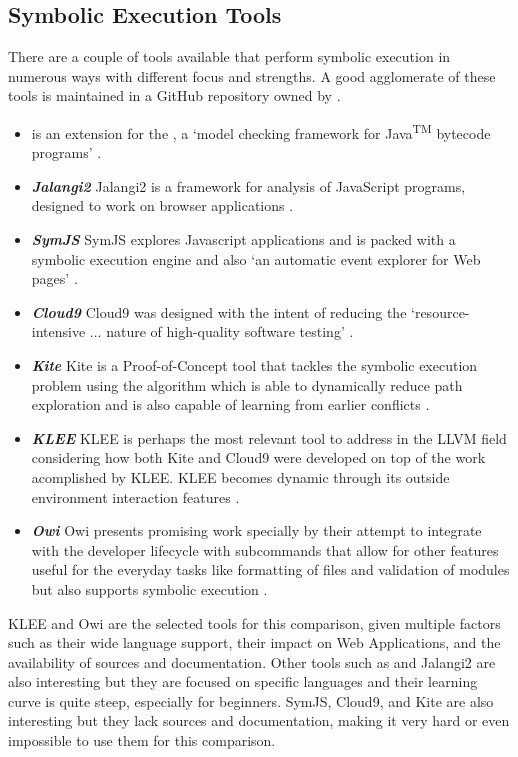 \subsection{Symbolic Execution Tools}\label{chap:symbolic_execution_tools}

There are a couple of tools available that perform symbolic execution in numerous ways with different focus and strengths. A good agglomerate of these tools is maintained in a GitHub repository owned by \citeauthor{Luckow2017} \cite{Luckow2017}. 

\newcommand{\setool}[1]{\item{\textbf{\textit{#1}}}}
\begin{itemize}
    \setool{}  is an extension for the , a `model checking framework for Java\textsuperscript{TM} bytecode programs' \cite{spf,jpf_wiki}. %
    \setool{Jalangi2} Jalangi2 is a framework for analysis of JavaScript programs, designed to work on browser applications \cite{jalangi2}.
    \setool{SymJS} SymJS explores Javascript applications and is packed with a symbolic execution engine and also `an automatic event explorer for Web pages' \cite{Li2014}.
    \setool{Cloud9} Cloud9 was designed with the intent of reducing the `resource-intensive ... nature of high-quality software testing' \cite{cloud9}.
    \setool{Kite} Kite is a Proof-of-Concept tool that tackles the symbolic execution problem using the  algorithm which is able to dynamically reduce path exploration and is also capable of learning from earlier conflicts \cite{cdse_kite,kite_web}.
    \setool{KLEE} KLEE is perhaps the most relevant tool to address in the LLVM field considering how both Kite and Cloud9 were developed on top of the work acomplished by KLEE. KLEE becomes dynamic through its outside environment interaction features \cite{Cadar2008}.
    \setool{Owi} Owi presents promising work specially by their attempt to integrate with the  developer lifecycle with subcommands that allow for other features useful for the everyday tasks like formatting of files and validation of modules but also supports symbolic execution \cite{owi_gh}.
\end{itemize}

KLEE and Owi are the selected tools for this comparison, given multiple factors such as their wide language support, their impact on Web Applications, and the availability of sources and documentation. Other tools such as  and Jalangi2 are also interesting but they are focused on specific languages and their learning curve is quite steep, especially for beginners. SymJS, Cloud9, and Kite are also interesting but they lack sources and documentation, making it very hard or even impossible to use them for this comparison.
